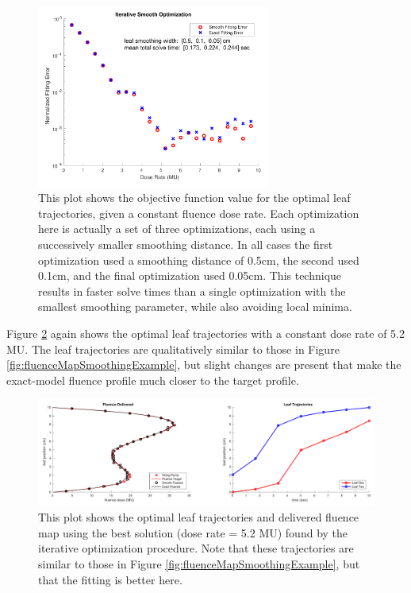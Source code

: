 \begin{figure}
  \centering
  \includegraphics[width=3in]{fig/iterSmoothSweep.pdf}
  \caption{This plot shows the objective function value for the optimal leaf trajectories,
           given a constant fluence dose rate. Each optimization here is actually a set of three
           optimizations, each using a successively smaller smoothing distance. In all cases
           the first optimization used a smoothing distance of 0.5cm, the second used 0.1cm,
           and the final optimization used 0.05cm. This technique results in faster solve times
           than a single optimization with the smallest smoothing parameter, while also avoiding
           local minima.}
  \label{fig:iterSmoothSweep}
\end{figure}

Figure \ref{fig:fluenceMapIterativeBest} again shows the optimal leaf trajectories with a
constant dose rate of 5.2 MU. The leaf trajectories are qualitatively similar to those in
Figure \ref{fig:fluenceMapSmoothingExample}, but slight changes are present that make the
exact-model fluence profile much closer to the target profile.

\begin{figure}
  \centering
  \includegraphics[width=\textwidth]{fig/fluenceMapIterativeBest.pdf}
  \caption{This plot shows the optimal leaf trajectories and delivered fluence map using the
           best solution (dose rate = 5.2 MU) found by the iterative optimization procedure.
           Note that these trajectories are similar to those in
           Figure \ref{fig:fluenceMapSmoothingExample}, but that the fitting is better here.}
  \label{fig:fluenceMapIterativeBest}
\end{figure}


